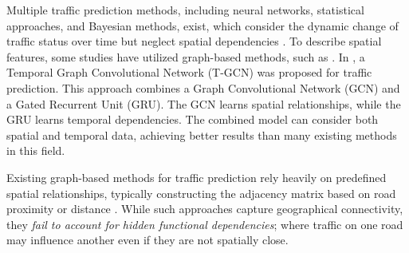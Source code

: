 \documentclass[pdflatex,sn-mathphys-num]{sn-jnl}%
\theoremstyle{thmstyleone}%
\theoremstyle{thmstyletwo}%
\theoremstyle{thmstylethree}%
\begin{document}
Multiple traffic prediction methods, including neural networks, statistical approaches, and Bayesian methods, exist, which consider the dynamic change of traffic status over time but neglect spatial dependencies \citep{akhtar2021review}. 
To describe spatial features, some studies have utilized graph-based methods, such as \cite{ye2020build,xie2020urban,Chen2023Dynamic,ZHOU2025110304}. In \cite{zhao2019t}, a Temporal Graph Convolutional Network (T-GCN) was proposed for traffic prediction. This approach combines a Graph Convolutional Network (GCN) and a Gated Recurrent Unit (GRU). The GCN learns spatial relationships, while the GRU learns temporal dependencies. The combined model can consider both spatial and temporal data, achieving better results than many existing methods in this field.


Existing graph-based methods for traffic prediction rely heavily on {predefined spatial relationships}, typically constructing the adjacency matrix based on road proximity or distance \citep{zhao2019t}. While such approaches capture geographical connectivity, they \textit{fail to account for hidden functional dependencies}; where traffic on one road may influence another even if they are not spatially close.

%
\end{document}
